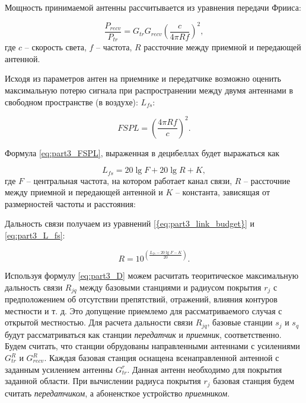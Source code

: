 Мощность принимаемой антенны рассчитывается из уравнения передачи Фрииса:

\begin{displaymath}
\label{eq:part3_Friis}
\frac{P_{recv}}{P_{tr}} = G_{tr}G_{recv}\left(\frac{c}{4\pi R f} \right)^2,
\end{displaymath}
где
$c$ --  скорость света,
$f$ -- частота, 
$R$ рассточние между приемной и передающей антенной.

Исходя из параметров антен на приемнике и передатчике возможно оценить максимальную потерю сигнала при распространении между двумя антеннами в свободном пространстве (в воздухе): $L_{fs}$:

\begin{equation}
\label{eq:part3_FSPL}
FSPL = \left(\frac{4\pi R f}{c} \right)^2.
\end{equation}

Формула \cref{eq:part3_FSPL}, выраженная в децибеллах будет выражаться как

\begin{equation}
\label{eq:part3_L_fs}
L_{fs} = 20 \lg{F} + 20\lg{R} + K,
\end{equation}
где $F$ -- центральная частота, на котором работает канал связи, $R$ -- рассточние между приемной и передающей антенной и $K$ -- константа, зависящая от размерностей частоты и расстояния:

Дальность связи получаем из уравнений \cref{{eq:part3_link_budget}} и \cref{eq:part3_L_fs}:

\begin{equation}
\label{eq:part3_D}
R = 10^{\left(\frac{L_{fs} - 20\lg{F} - K}{20}\right)}.
\end{equation}

Используя формулу \cref{eq:part3_D} можем расчитать теоритическое максимальную дальность связи $ R_{jq}$ между базовыми станциями и радиусом покрытия $ r_j $ с предположением об отсутствии препятствий, отражений, влияния контуров местности и т. д. Это допущение приемлемо для рассматриваемого случая с открытой местностью. Для расчета дальности связи $R_{jq}$, базовые станции $s_j$ и $s_q$ будут рассматриваться как станции \textit{передатчик} и \textit{приемник}, соответственно. Будем считать, что станции обрудованы направленными антеннами с усилениями $G_{tr}^{R}$ и $G_{recv}^{R}$. Каждая базовая станция оснащена всенаправленной антенной с заданным усилением антенны $G_ {tr}^{r}$. Данная антенн необходимо для покрытия заданной области. При вычислении радиуса покрытия $r_j$ базовая станция будем считать \textit{передатчиком}, а абоненсткое устройство \textit{приемником}.

